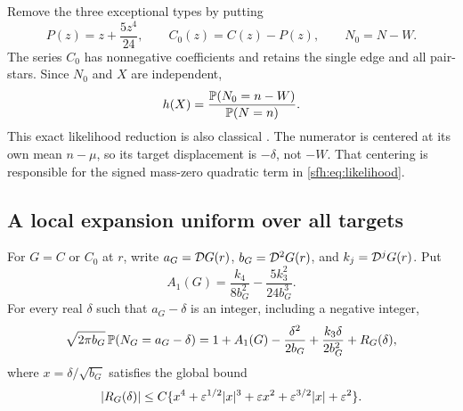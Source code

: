 Remove the three exceptional types by putting
\[
 P(z)=z+\frac{5z^4}{24},\qquad C_0(z)=C(z)-P(z),\qquad N_0=N-W.
\]
The series $C_0$ has nonnegative coefficients and retains the single edge and all pair-stars. Since $N_0$ and $X$ are independent,
\begin{equation}\label{sfh:eq:exacth}
 h(X)=\frac{\mathbb P(N_0=n-W)}{\mathbb P(N=n)}.
\end{equation}
This exact likelihood reduction is also classical \cite[Theorems 3 and 5]{arratia}. The numerator is centered at its own mean $n-\mu$, so its target displacement is $-\delta$, not $-W$. That centering is responsible for the signed mass-zero quadratic term in \eqref{sfh:eq:likelihood}.

\subsection{A local expansion uniform over all targets}
\begin{lemma}\label{sfh:lem:local}
For $G=C$ or $C_0$ at $r$, write $a_G=\mathcal D G(r)$, $b_G=\mathcal D^2G(r)$, and $k_j=\mathcal D^jG(r)$. Put
\[
 A_1(G)=\frac{k_4}{8b_G^2}-\frac{5k_3^2}{24b_G^3}.
\]
For every real $\delta$ such that $a_G-\delta$ is an integer, including a negative integer,
\begin{equation}\label{sfh:eq:local}
 \sqrt{2\pi b_G}\,\mathbb P(N_G=a_G-\delta)
 =1+A_1(G)-\frac{\delta^2}{2b_G}
        +\frac{k_3\delta}{2b_G^2}+R_G(\delta),
\end{equation}
where $x=\delta/\sqrt{b_G}$ satisfies the global bound
\begin{equation}\label{sfh:eq:globalR}
 |R_G(\delta)|\le C\{x^4+\varepsilon^{1/2}|x|^3+\varepsilon x^2
                         +\varepsilon^{3/2}|x|+\varepsilon^2\}.
\end{equation}
\end{lemma}
